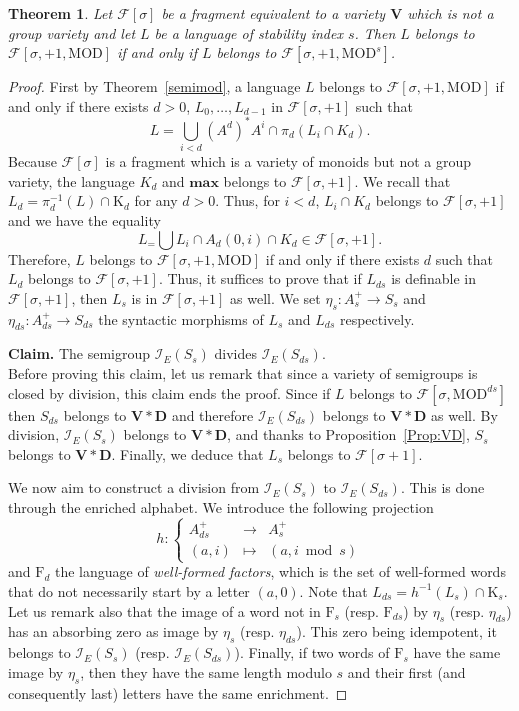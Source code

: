 \documentclass[submission,hidelink]{dmtcs-episciences}
\newtheorem{theorem}{Theorem}
\newcommand{\WF}{K}
\newcommand{\WFp}[1]{\textrm{K}_{#1}}
\newcommand{\WFpp}[1]{\textrm{F}_{#1}}
\newcommand{\D}{\mathbf{D}}
\newcommand{\V}{\mathbf{V}}
\newcommand{\cF}{\mathcal{F}}
\newcommand{\Ae}{A_d}
\newcommand{\MOD}{\mathrm{MOD}}
\newcommand{\tinf}[1]{\mathcal{I}_E(#1)}
\begin{document}
\begin{theorem}\label{thm:delayinftest}
	Let $\cF[\sigma]$ be a fragment equivalent to a variety $\V$ which is not a group variety and
	let $L$ be a language of stability index $s$. Then $L$ belongs to $\cF[\sigma,+1,\MOD]$ if and only if
	$L$ belongs to $\cF[\sigma,+1,\MOD^s]$.
\end{theorem}
\begin{proof}
	First by Theorem~\ref{semimod}, a language $L$ belongs to $\cF[\sigma,+1,\MOD]$ if and only if there exists
	$d>0$, $L_0,\ldots,L_{d-1}$ in $\cF[\sigma,+1]$ such that
	$$L = \bigcup_{i<d} (A^d)^*A^i \cap \pi_d(L_i\cap \WF_d).$$
	Because $\cF[\sigma]$ is a fragment which is a variety of monoids but not a group variety, the
	language $\WF_d$ and $\textbf{max}$ belongs to $\cF[\sigma,+1]$.
	 We recall that $L_d=\pi_d^{-1}(L)\cap \WFp{d}$ for any $d>0$.
	Thus, for $i<d$,  $L_i\cap \WF_d$ belongs to $\cF[\sigma,+1]$ and we have the equality
	$$L_ = \bigcup L_i \cap \Ae(0,i) \cap \WF_d\in \cF[\sigma,+1].$$
	Therefore, $L$ belongs to $\cF[\sigma,+1,\MOD]$ if and only if there exists $d$ such that
	$L_d$ belongs to $\cF[\sigma,+1]$.
		Thus, it suffices to prove that
		if $L_{ds}$ is definable in $\cF[\sigma,+1]$, then
		$L_s$ is in $\cF[\sigma,+1]$ as well.
		We set $\eta_s:A_s^+\to S_s$ and $\eta_{ds}\colon A_{ds}^+\to S_{ds}$  the syntactic morphisms
		of $L_s$ and $L_{ds}$ respectively.

		\noindent\textbf{Claim.} The semigroup $\tinf{S_s}$ divides $\tinf{S_{ds}}$.\\

		Before proving this claim, let us remark that since a variety of semigroups is closed by division,
		this claim ends the proof. Since
		if $L$ belongs to $\cF[\sigma,\MOD^{ds}]$ then $S_{ds}$ belongs to $\V*\D$ and therefore
		$\tinf{S_{ds}}$ belongs to $\V*\D$ as well.
		By division, $\tinf{S_s}$ belongs to $\V*\D$, and thanks to Proposition~\ref{Prop:VD}, $S_s$ belongs to $\V*\D$. Finally, we deduce that $L_s$
		belongs to $\cF[\sigma+1]$.

		We now aim to construct a division from $\tinf{S_s}$ to $\tinf{S_{ds}}$.
		This is done through the enriched alphabet.
		We introduce the following projection
		$$h\colon\left\{\begin{array}{ccc}
			A_{ds}^+&\to& A_{s}^+\\
			(a,i)&\mapsto& (a,i\bmod{s})
			\end{array}\right.$$
		and $\WFpp{d}$ the language of \emph{well-formed factors},
		 which is the set of well-formed words that do not necessarily start by a letter $(a,0)$.
Note that
		${L_{ds} = h^{-1}(L_s)\cap \WFp{s}}$.
		Let us remark also that the image of a word not in $\WFpp{s}$ (resp. $\WFpp{ds}$)  by $\eta_s$ (resp. $\eta_{ds}$)
		has
		an absorbing zero as image by $\eta_s$ (resp. $\eta_{ds}$).
		This zero being idempotent, it belongs to $\tinf{S_s}$ (resp. $\tinf{S_{ds}}$).
		Finally, if two words of $\WFpp{s}$ have the same image by $\eta_s$, then
		they have the same length modulo $s$ and their first (and consequently last) letters have the same enrichment.


\end{proof}
\end{document}
